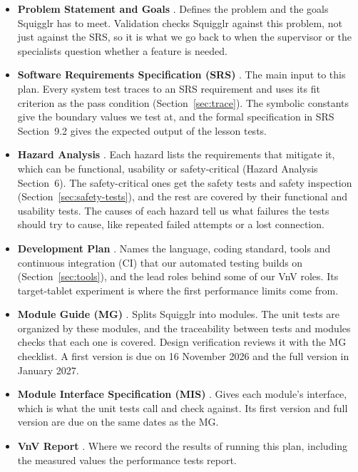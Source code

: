 \documentclass[12pt, titlepage]{article}
\begin{document}
\begin{itemize}
  \item \textbf{Problem Statement and Goals} \citep{PSG}. Defines the problem
    and the goals Squigglr has to meet. Validation checks Squigglr against
    this problem, not just against the SRS, so it is what we go back to when
    the supervisor or the specialists question whether a feature is needed.
  \item \textbf{Software Requirements Specification (SRS)} \citep{SRS}. The
    main input to this plan. Every system test traces to an SRS requirement
    and uses its fit criterion as the pass condition
    (Section~\ref{sec:trace}). The symbolic constants give the boundary values
    we test at, and the formal specification in SRS Section~9.2 gives the
    expected output of the lesson tests.
  \item \textbf{Hazard Analysis} \citep{HA}. Each hazard lists the requirements
    that mitigate it, which can be functional, usability or safety-critical
    (Hazard Analysis Section~6). The safety-critical ones get the safety tests
    and safety inspection (Section~\ref{sec:safety-tests}), and the rest are
    covered by their functional and usability tests. The causes of each
    hazard tell us what failures the tests should try to cause, like
    repeated failed attempts or a lost connection.
  \item \textbf{Development Plan} \citep{DevPlan}. Names the language, coding
    standard, tools and continuous integration (CI) that our automated testing builds on
    (Section~\ref{sec:tools}), and the lead roles behind some of our VnV
    roles.
    Its target-tablet experiment is where the first performance limits come
    from.
  \item \textbf{Module Guide (MG)} \citep{MG}. Splits Squigglr into modules. The unit tests are organized by these
    modules, and the traceability between tests and modules checks that each
    one is covered. Design verification reviews it with the MG checklist. A
    first version is due on 16 November 2026 and the full version in January
    2027.
  \item \textbf{Module Interface Specification (MIS)} \citep{MIS}. Gives each module's interface, which is what the unit tests call and check
    against. Its first version and full version are due on the same dates as
    the MG.
  \item \textbf{VnV Report} \citep{VnVReport}. Where we record the results of
    running this plan, including the measured values the performance tests
    report.
\end{itemize}
\end{document}
